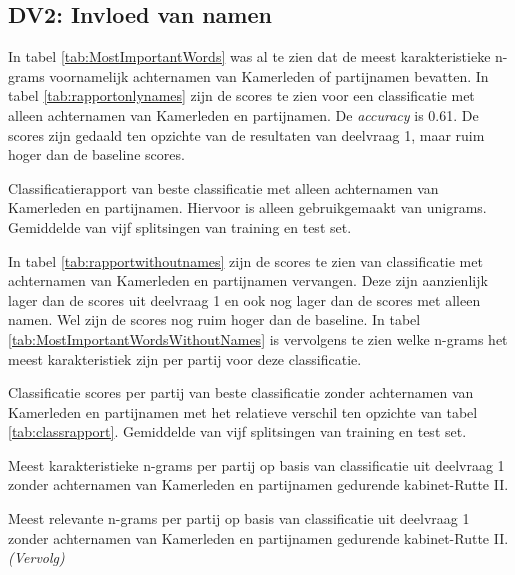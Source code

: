 \subsection{DV2: Invloed van namen}
In tabel \ref{tab:MostImportantWords} was al te zien dat de meest karakteristieke n-grams voornamelijk achternamen van Kamerleden of partijnamen bevatten. In tabel \ref{tab:rapportonlynames} zijn de scores te zien voor een classificatie met alleen achternamen van Kamerleden en partijnamen. De \textit{accuracy} is 0.61. De scores zijn gedaald ten opzichte van de resultaten van deelvraag 1, maar ruim hoger dan de baseline scores.\par
\begin{table}[H]
\caption{Classificatierapport van beste classificatie met alleen achternamen van Kamerleden en partijnamen. Hiervoor is alleen gebruikgemaakt van unigrams. Gemiddelde van vijf splitsingen van training en test set.}
\label{tab:rapportonlynames}
\centering

\end{table}

In tabel \ref{tab:rapportwithoutnames} zijn de scores te zien van classificatie met achternamen van Kamerleden en partijnamen vervangen. Deze zijn aanzienlijk lager dan de scores uit deelvraag 1 en ook nog lager dan de scores met alleen namen. Wel zijn de scores nog ruim hoger dan de baseline. In tabel \ref{tab:MostImportantWordsWithoutNames} is vervolgens te zien welke n-grams het meest karakteristiek zijn per partij voor deze classificatie.\par
\begin{table}[H]
\caption{Classificatie scores per partij van beste classificatie zonder achternamen van Kamerleden en partijnamen met het relatieve verschil ten opzichte van tabel \ref{tab:classrapport}. Gemiddelde van vijf splitsingen van training en test set.}
\label{tab:rapportwithoutnames}
\centering

\end{table}

\begin{table}[H] 
\caption{Meest karakteristieke n-grams per partij op basis van classificatie uit deelvraag 1 zonder achternamen van Kamerleden en partijnamen gedurende kabinet-Rutte II.} 
\label{tab:MostImportantWordsWithoutNames} 
\centering
\hspace*{-0.8in}
 
\end{table} 
\addtocounter{table}{-1} 
\begin{table}[H] 
\caption{Meest relevante n-grams per partij op basis van classificatie uit deelvraag 1 zonder achternamen van Kamerleden en partijnamen gedurende kabinet-Rutte II. \emph{(Vervolg)}} 
\centering
\hspace*{-1.3in}
 
\end{table}



